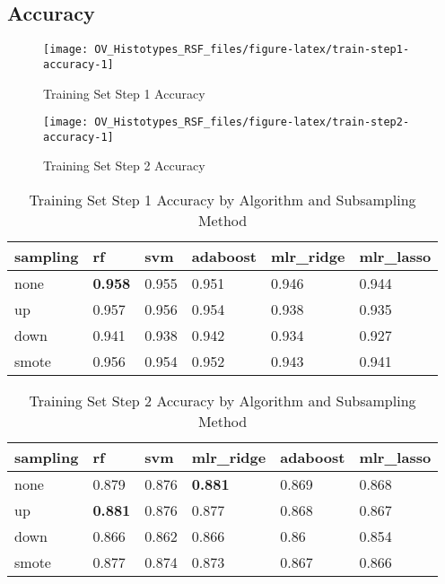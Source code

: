 \documentclass[
]{report}
\begin{document}
\hypertarget{accuracy-1}{%
\subsection{Accuracy}\label{accuracy-1}}

\begin{figure}[H]

{\centering \texttt{[image: OV\_Histotypes\_RSF\_files/figure-latex/train-step1-accuracy-1]} 

}

\caption{Training Set Step 1 Accuracy}\label{fig:train-step1-accuracy}
\end{figure}

\begin{figure}[H]

{\centering \texttt{[image: OV\_Histotypes\_RSF\_files/figure-latex/train-step2-accuracy-1]} 

}

\caption{Training Set Step 2 Accuracy}\label{fig:train-step2-accuracy}
\end{figure}

\begin{table}

\caption{\label{tab:train-step1-accuracy-table}Training Set Step 1 Accuracy by Algorithm and Subsampling Method}
\centering
\begin{tabular}[t]{l|l|l|l|l|l}
\hline
sampling & rf & svm & adaboost & mlr\_ridge & mlr\_lasso\\
\hline
none & \textbf{0.958} & 0.955 & 0.951 & 0.946 & 0.944\\
\hline
up & 0.957 & 0.956 & 0.954 & 0.938 & 0.935\\
\hline
down & 0.941 & 0.938 & 0.942 & 0.934 & 0.927\\
\hline
smote & 0.956 & 0.954 & 0.952 & 0.943 & 0.941\\
\hline
\end{tabular}
\end{table}

\begin{table}

\caption{\label{tab:train-step2-accuracy-table}Training Set Step 2 Accuracy by Algorithm and Subsampling Method}
\centering
\begin{tabular}[t]{l|l|l|l|l|l}
\hline
sampling & rf & svm & mlr\_ridge & adaboost & mlr\_lasso\\
\hline
none & 0.879 & 0.876 & \textbf{0.881} & 0.869 & 0.868\\
\hline
up & \textbf{0.881} & 0.876 & 0.877 & 0.868 & 0.867\\
\hline
down & 0.866 & 0.862 & 0.866 & 0.86 & 0.854\\
\hline
smote & 0.877 & 0.874 & 0.873 & 0.867 & 0.866\\
\hline
\end{tabular}
\end{table}
\end{document}
